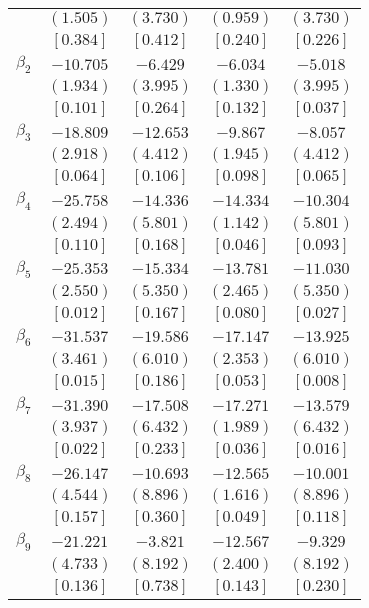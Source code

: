 \documentclass[12pt]{article}
\begin{document}
\begin{table}[H]
\begin{adjustbox}{scale=0.7}
\begin{tabular}{lcccc}
& $(  1.505)$ & $(  3.730)$ & $(  0.959)$ & $(  3.730)$ \\
& $[  0.384]$ & $[  0.412]$ & $[  0.240]$ & $[  0.226]$ \\
$\beta_{2}$ & $-10.705$ & $ -6.429$ & $ -6.034$ & $ -5.018$ \\
& $(  1.934)$ & $(  3.995)$ & $(  1.330)$ & $(  3.995)$ \\
& $[  0.101]$ & $[  0.264]$ & $[  0.132]$ & $[  0.037]$ \\
$\beta_{3}$ & $-18.809$ & $-12.653$ & $ -9.867$ & $ -8.057$ \\
& $(  2.918)$ & $(  4.412)$ & $(  1.945)$ & $(  4.412)$ \\
& $[  0.064]$ & $[  0.106]$ & $[  0.098]$ & $[  0.065]$ \\
$\beta_{4}$ & $-25.758$ & $-14.336$ & $-14.334$ & $-10.304$ \\
& $(  2.494)$ & $(  5.801)$ & $(  1.142)$ & $(  5.801)$ \\
& $[  0.110]$ & $[  0.168]$ & $[  0.046]$ & $[  0.093]$ \\
$\beta_{5}$ & $-25.353$ & $-15.334$ & $-13.781$ & $-11.030$ \\
& $(  2.550)$ & $(  5.350)$ & $(  2.465)$ & $(  5.350)$ \\
& $[  0.012]$ & $[  0.167]$ & $[  0.080]$ & $[  0.027]$ \\
$\beta_{6}$ & $-31.537$ & $-19.586$ & $-17.147$ & $-13.925$ \\
& $(  3.461)$ & $(  6.010)$ & $(  2.353)$ & $(  6.010)$ \\
& $[  0.015]$ & $[  0.186]$ & $[  0.053]$ & $[  0.008]$ \\
$\beta_{7}$ & $-31.390$ & $-17.508$ & $-17.271$ & $-13.579$ \\
& $(  3.937)$ & $(  6.432)$ & $(  1.989)$ & $(  6.432)$ \\
& $[  0.022]$ & $[  0.233]$ & $[  0.036]$ & $[  0.016]$ \\
$\beta_{8}$ & $-26.147$ & $-10.693$ & $-12.565$ & $-10.001$ \\
& $(  4.544)$ & $(  8.896)$ & $(  1.616)$ & $(  8.896)$ \\
& $[  0.157]$ & $[  0.360]$ & $[  0.049]$ & $[  0.118]$ \\
$\beta_{9}$ & $-21.221$ & $ -3.821$ & $-12.567$ & $ -9.329$ \\
& $(  4.733)$ & $(  8.192)$ & $(  2.400)$ & $(  8.192)$ \\
& $[  0.136]$ & $[  0.738]$ & $[  0.143]$ & $[  0.230]$ \\

\end{tabular}
\end{adjustbox}
\end{table}
\end{document}
